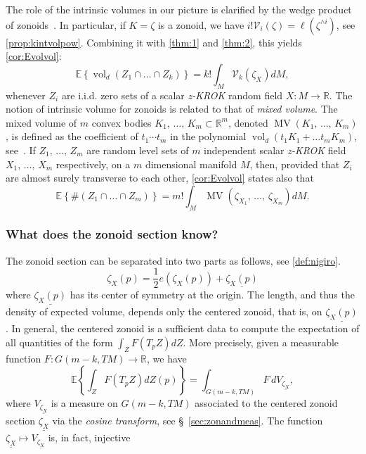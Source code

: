 \documentclass[10pt]{amsart}
\theoremstyle{definition}\newtheorem{defi}[theo]{Definition}\newtheorem{rema}[theo]{Remark}\newtheorem{exam}[theo]{Example}\newtheorem{exem}[theo]{Example}\newtheorem{nota}[theo]{Notation}
\newcommand{\R}{\mathbb{R}}
\newcommand{\EE}{\mathbb{E}}
\DeclareMathOperator{\vol}{vol}
\DeclareMathOperator{\MV}{MV}
\newcommand{\Vint}{\mathcal{V}}
\newcommand{\seg}{\underline}
\newcommand{\zkrok}{\emph{z-KROK}\xspace}
\begin{document}
The role of the intrinsic volumes in our picture is clarified by the wedge product of zonoids~\cite{ZA}. In particular, if $K=\zeta$ is a zonoid, we have $ i!\Vint_i(\zeta)=\ell(\zeta^{\wedge i}) $, see \cref{prop:kintvolpow}. Combining it with \cref{thm:1} and \cref{thm:2}, this yields \cref{cor:Evolvol}:
\begin{equation*}
\EE\left\{\vol_d(Z_1\cap \dots \cap Z_k)\right\}=k!\int_M\Vint_k(\zeta_{X})dM,
\end{equation*}
whenever $Z_i$ are i.i.d. zero sets of a scalar {\zkrok} random field $X\colon M\to \R$. The notion of intrinsic volume for zonoids is related to that of \emph{mixed volume}. The mixed volume of $m$ convex bodies $K_1,\,\ldots,\,K_m\subset \R^m$, denoted $\MV(K_1,\,\dots,\,K_m)$, is defined as the coefficient of $t_1\cdots t_m$ in the polynomial $\vol_d(t_1K_1+\dots t_mK_m)$, see~\cite[Theorem~5.1.7]{bible}. If $Z_1,\,\ldots,\,Z_m$ are random level sets of $m$ independent scalar {\zkrok} field $X_1,\,\ldots,\,X_m$ respectively, on a $m$ dimensional manifold $M$, then, provided that $Z_i$ are almost surely transverse to each other, \cref{cor:Evolvol} states also that
\begin{equation*}
\EE\left\{\#(Z_1\cap \dots \cap Z_m)\right\}=m!\int_M\MV(\zeta_{X_1},\,\dots,\,\zeta_{X_m})dM.
\end{equation*}

\subsubsection{What does the zonoid section know?}

The zonoid section can be separated into two parts as follows, see \cref{def:nigiro}.
\begin{equation}\label{eq:separation}
\zeta_X(p)=\frac12 e(\zeta_X(p))+\underline{\zeta_X(p)}
\end{equation}
where $\underline{\zeta_X(p)}$ has its center of symmetry at the origin. The length, and thus the density of expected volume, depends only the centered zonoid, that is, on $\underline{\zeta_X(p)}$. In general, the centered zonoid is a sufficient data to compute the expectation of all quantities of the form $\int_ZF(T_pZ)dZ$. More precisely, given a measurable function $F:G(m-k,TM)\to \R$, we have
\begin{equation}\label{eq:sexy}
\EE\left\{\int_Z F\left( T_pZ\right) dZ(p)\right\}=\int_{G(m-k,TM)}F\, d V_{\seg{\zeta_X}},
\end{equation}
where $V_{\seg{\zeta_X}}$ is a measure on $G(m-k,TM)$ associated to the centered zonoid section $\seg{\zeta_X}$ via the \emph{cosine transform}, see \S~\ref{sec:zonandmeas}. The function $\seg{\zeta_X}\mapsto V_{\seg{\zeta_X}}$ is, in fact, injective
\end{document}
